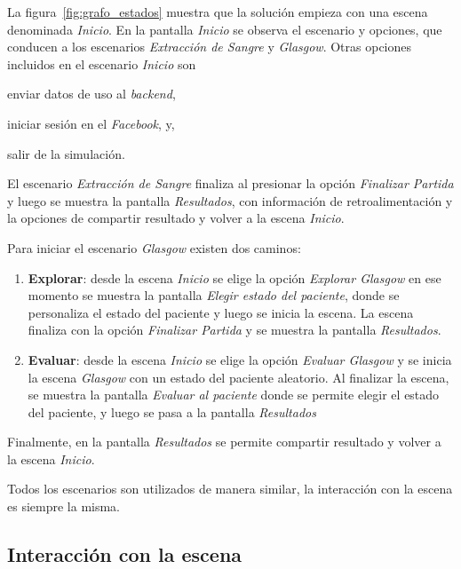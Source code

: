  
La figura~\ref{fig:grafo_estados} muestra que la solución empieza con una escena
denominada \emph{Inicio}. En la pantalla \emph{Inicio} se observa el escenario y 
opciones, que conducen a los escenarios \emph{Extracción de Sangre} y
\emph{Glasgow}. Otras opciones incluidos en el escenario \emph{Inicio} son
\begin{enumerate*}[label=\itshape\alph*\upshape)]
\item enviar datos de uso al \emph{backend},
\item iniciar sesión en el \emph{Facebook}, y,
\item salir de la simulación.
\end{enumerate*}


El escenario \emph{Extracción de Sangre} finaliza al presionar la opción
\emph{Finalizar Partida} y luego se muestra la pantalla \emph{Resultados}, con
información de retroalimentación y la opciones de compartir resultado y volver
a la escena \emph{Inicio}.

Para iniciar el escenario \emph{Glasgow} existen dos caminos:
\begin{enumerate}
\item \textbf{Explorar}: desde la escena \emph{Inicio} se elige la opción \emph{Explorar
        Glasgow} en ese momento se muestra la pantalla \emph{Elegir estado del
        paciente}, donde se personaliza el estado del paciente y luego se inicia
    la escena. La escena finaliza con la opción \emph{Finalizar Partida} y se
    muestra la pantalla \emph{Resultados}.
\item \textbf{Evaluar}: desde la escena \emph{Inicio} se elige la opción \emph{Evaluar
        Glasgow} y se inicia la escena \emph{Glasgow} con un estado del paciente
    aleatorio.
    Al finalizar la escena, se muestra la pantalla \emph{Evaluar al paciente}
    donde se permite elegir el estado del paciente, y luego se pasa a la
    pantalla \emph{Resultados}
\end{enumerate}

Finalmente, en la pantalla \emph{Resultados} se permite compartir resultado y
volver a la escena \emph{Inicio}.

Todos los escenarios son utilizados de manera similar, la interacción con la
escena es siempre la misma.

\subsection{Interacción con la escena}

